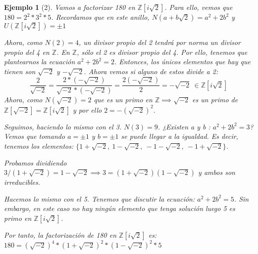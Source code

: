 \documentclass[11pt, a4paper, titlepage]{article}
\newif\IfInSansMode
\providecommand{\ent}{\mathbb{Z}}
\theoremstyle{theorem-style}
\theoremstyle{definition-style}
\theoremstyle{remark-style}
\theoremstyle{example-style}
\newtheorem{ejemplo}{Ejemplo}[section]
\begin{document}
\begin{ejemplo}[2]
	Vamos a factorizar 180 en $\ent[i\sqrt2]$. Para ello, vemos que $180 = 2^2 * 3^2 * 5$. Recordamos que en este anillo, $N(a+b\sqrt2) = a^2 +2b^2$ y $U(\ent[i\sqrt2]) = \pm 1$

	Ahora, como $N(2) = 4$, un divisor propio del 2 tendrá por norma un divisor propio del 4 en $\ent$. En $\ent$, sólo el 2 es divisor propio del 4. Por ello, tenemos que plantearnos la ecuación $a^2+2b^2 = 2$. Entonces, los únicos elementos que hay que tienen son $\sqrt{-2}$ y $-\sqrt{-2}$.
	Ahora vemos si alguno de estos divide a 2:
	\[
	\frac{2}{\sqrt{-2}} =  \frac{2*(-\sqrt{-2})}{\sqrt{-2}*(-\sqrt{-2})}= \frac{2(-\sqrt{-2})}{2} = -\sqrt{-2} \ \in \ent[i\sqrt2]
	\]
	Ahora, como $N(\sqrt{-2})=2$ que es un primo en $\ent \implies \sqrt{-2}$ es un primo de $\ent[\sqrt{-2}] = \ent[i\sqrt2]$ y por ello $2=-(\sqrt{-2})^2$.

	Seguimos, haciendo lo mismo con el 3. $N(3) = 9$. ¿Existen a y b : $a^2 + 2b^2 = 3$? Vemos que tomando $a=\pm 1$ y $b=\pm1$ se puede llegar a la igualdad. Es decir, tenemos los elementos: $\{1+\sqrt{-2}, \ 1-\sqrt{-2}, \ -1-\sqrt{-2}, \ - 1 + \sqrt{-2}\}$.

	Probamos dividiendo $3/(1+\sqrt{-2}) = 1 - \sqrt{-2}\implies 3 = (1+\sqrt{-2})(1-\sqrt{-2})$ y ambos son irreducibles.

	Hacemos lo mismo con el 5. Tenemos que discutir la ecuación: $a^2+2b^2 = 5$. Sin embargo, en este caso no hay ningún elemento que tenga solución luego 5 es primo en $\ent[i\sqrt2]$.

	Por tanto, la factorización de 180 en $\ent[i\sqrt2]$ es: $180 = (\sqrt{-2})^4*(1+\sqrt{-2})^2*(1-\sqrt{-2})^2*5$
\end{ejemplo}
\end{document}
